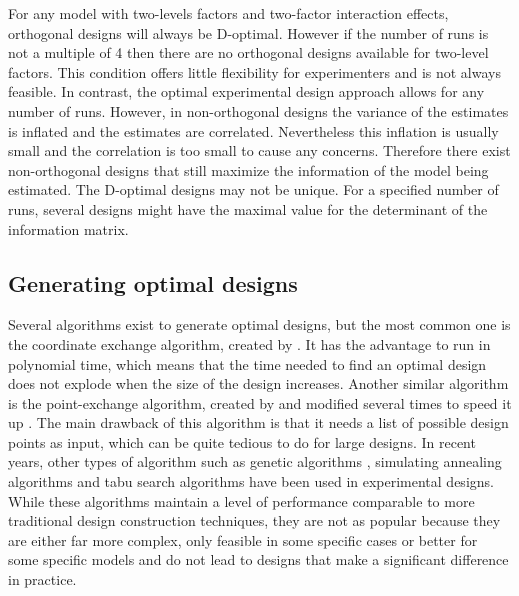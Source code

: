 For any model with two-levels factors and two-factor interaction effects, orthogonal designs will always be D-optimal. 
However if the number of runs is not a multiple of 4 then there are no orthogonal designs available for two-level factors. 
This condition offers little flexibility for experimenters and is not always feasible. 
In contrast, the optimal experimental design approach allows for any number of runs. 
However, in non-orthogonal designs the variance of the estimates is inflated and the estimates are correlated. 
Nevertheless this inflation is usually small and the correlation is too small to cause any concerns.
Therefore there exist non-orthogonal designs that still maximize the information of the model being estimated.
The D-optimal designs may not be unique. For a specified number of runs,
 several designs might have the maximal value for the determinant of the information matrix.\\


\subsection{Generating optimal designs}
Several algorithms exist to generate optimal designs, but the most common one is 
the coordinate exchange algorithm, created by \textcite{meyer_coordinate-exchange_1995}. 
It has the advantage to run in polynomial time, which means that the time needed to find an optimal design does not explode when 
the size of the design increases. 
Another similar algorithm is the point-exchange algorithm, created by \textcite{fedorov_theory_1972} and modified several times to speed 
it up \parencite{johnson_guidelines_1983,atkinson_construction_1989}. The main drawback of this algorithm is that it needs a list of 
possible design points as input, which can be quite tedious to do for large designs. In recent years, other types of algorithm 
such as genetic algorithms \parencite{heredia-langner_genetic_2003,heredia-langner_model-robust_2004}, simulating annealing algorithms 
\parencite{bohachevsky_generalized_1986,meyer_constructing_1988} and tabu search algorithms \parencite{jung_construction_1996} have 
been used in experimental designs. While these algorithms maintain a level of performance comparable to more traditional design 
construction techniques, they are not as popular because they are either far more complex, only feasible in some specific cases 
or better for some specific models and do not lead to designs that make a significant difference in practice.\\

